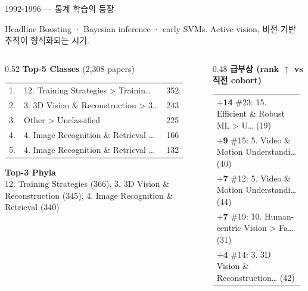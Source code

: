 \documentclass[aspectratio=169,t]{beamer}
\newcommand{\hot}[1]{\textcolor{accentorange}{\textbf{#1}}}
\newcommand{\muted}[1]{\textcolor{mutedgray}{#1}}
\begin{document}
\begin{frame}{1992-1996 \quad — \quad 통계 학습의 등장}
\small
\begin{block}{Headline}
Boosting · Bayesian inference · early SVMs. Active vision, 비전-기반 추적이 형식화되는 시기.
\end{block}
\vspace{4pt}

\begin{columns}[T,onlytextwidth]
\begin{column}{0.52\textwidth}
\textbf{Top-5 Classes} \muted{\scriptsize (2,308 papers)}\\[2pt]
\scriptsize
\begin{tabular}{@{}rlr@{}}
    1. & 12. Training Strategies > Trainin… & 352 \\
    2. & 3. 3D Vision \& Reconstruction > 3… & 243 \\
    3. & Other > Unclassified & 225 \\
    4. & 4. Image Recognition \& Retrieval … & 166 \\
    5. & 4. Image Recognition \& Retrieval … & 132 \\
\end{tabular}
\vspace{8pt}

\textbf{\small Top-3 Phyla}\\[2pt]
\scriptsize 12. Training Strategies (366), 3. 3D Vision \& Reconstruction (345), 4. Image Recognition \& Retrieval (340)
\end{column}

\begin{column}{0.48\textwidth}
\textbf{급부상 (rank $\uparrow$ vs 직전 cohort)}\\[2pt]
\scriptsize
\begin{tabular}{@{}p{0.95\linewidth}@{}}
    \hot{$+$14} \#23: 15. Efficient \& Robust ML > U… (19) \\
    \hot{$+$9} \#15: 5. Video \& Motion Understandi… (40) \\
    \hot{$+$7} \#12: 5. Video \& Motion Understandi… (44) \\
    \hot{$+$7} \#19: 10. Human-centric Vision > Fa… (31) \\
    \hot{$+$4} \#14: 3. 3D Vision \& Reconstruction… (42) \\
\end{tabular}
\end{column}
\end{columns}
\end{frame}
\end{document}
